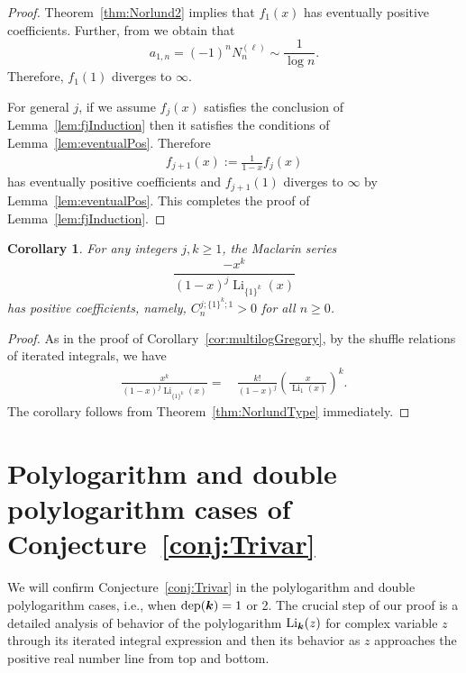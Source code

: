 \documentclass[11pt]{article}
\newcommand{\bfk}{{\boldsymbol{\sl{k}}}}
\DeclareMathOperator*{\dep}{dep}
\DeclareMathOperator{\Li}{Li}
\theoremstyle{plain}
\newtheorem{cor}[thm]{Corollary}
\theoremstyle{definition}
\begin{document}
\begin{proof}
Theorem~\ref{thm:Norlund2} implies that $f_1(x)$ has eventually positive coefficients.
Further, from \cite[(16) and (19)]{Bl2016} we obtain that
\begin{equation*}
     a_{1,n}=(-1)^n N_n^{(\ell)} \sim \frac{1}{\log n}.
\end{equation*}
Therefore, $f_1(1)$ diverges to $\infty$.

For general $j$, if we assume $f_j(x)$ satisfies the conclusion of Lemma~\ref{lem:fjInduction} then
it satisfies the conditions of Lemma~\ref{lem:eventualPos}. Therefore
\begin{align*}
f_{j+1}(x):=\frac{1}{1-x}f_j(x)
\end{align*}
has eventually positive coefficients and $f_{j+1}(1)$ diverges to $\infty$ by Lemma~\ref{lem:eventualPos}.
This completes the proof of Lemma~\ref{lem:fjInduction}.
\end{proof}


\begin{cor}\label{cor:multilogNorlund}
For any integers $j,k\ge 1$, the Maclarin series
\begin{equation*}
    \frac{-x^k}{(1-x)^j \Li_{\{1\}^k}(x)}
\end{equation*}
has positive coefficients, namely, $C_n^{j;\{1\}^k;1}>0$ for all $n\ge 0$.
\end{cor}
\begin{proof}
As in the proof of Corollary~\ref{cor:multilogGregory}, by the shuffle relations of iterated integrals, we have
\begin{align*}
\frac{x^k}{(1-x)^j\Li_{\{1\}^k}(x)}=&\,\frac{k!}{(1-x)^j}\left(\frac{x}{\Li_1(x)}\right)^k.
\end{align*}
The corollary follows from Theorem~\ref{thm:NorlundType} immediately.
\end{proof}

\section{Polylogarithm and double polylogarithm cases of Conjecture~\ref{conj:Trivar}}\label{sec:TrivarDepth1}

We will confirm Conjecture~\ref{conj:Trivar} in the polylogarithm and double polylogarithm cases, i.e., when $\dep(\bfk)=1$ or 2.
The crucial step of our proof is a detailed analysis of behavior of the polylogarithm $\Li_\bfk(z)$ for complex variable $z$ through its iterated integral expression and then its behavior as $z$ approaches the positive real number line from top and bottom.
\end{document}
